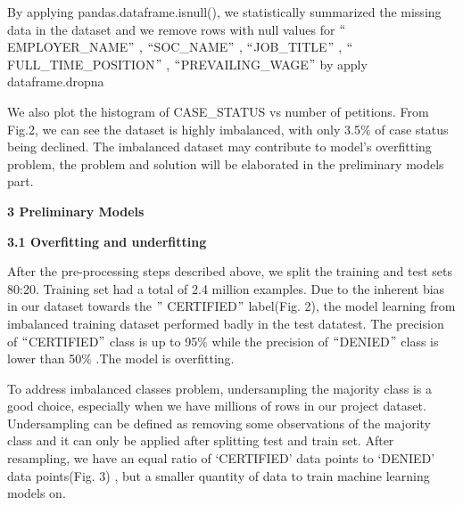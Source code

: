 \documentclass[12pt]{article}
\begin{document}
\begin{justify}
By applying pandas.dataframe.isnull(), we statistically summarized the missing data in the dataset and we remove rows with null values for $``$EMPLOYER\_NAME$"$ , $``$SOC\_NAME$"$ , $``$JOB\_TITLE$"$ , $``$FULL\_TIME\_POSITION$"$ , $``$PREVAILING\_WAGE$"$  by apply dataframe.dropna
\end{justify}\par

\begin{justify}
We also plot the histogram of CASE\_STATUS vs number of petitions. From Fig.2, we can see the dataset is highly imbalanced, with only 3.5$\%$  of case status being declined. The imbalanced dataset may contribute to model’s overfitting problem, the problem and solution will be elaborated in the preliminary models part.
\end{justify}\par

\tab 
\vspace{\baselineskip}\begin{FlushLeft}
{\fontsize{14pt}{16.8pt}\selectfont \textbf{3 Preliminary Models}\par}
\end{FlushLeft}\par

\begin{FlushLeft}
\textbf{3.1 Overfitting and underfitting}
\end{FlushLeft}\par

\begin{justify}
After the pre-processing steps described above, we split the training and test sets 80:20. Training set had a total of 2.4 million examples. Due to the inherent bias in our dataset towards the $"$ CERTIFIED$"$  label(Fig. 2), the model learning from imbalanced training dataset performed badly in the test datatest. The precision of $``$CERTIFIED$"$  class is up to 95$\%$  while the precision of $``$DENIED$"$  class is lower than 50$\%$  .The model is overfitting.
\end{justify}\par

\begin{justify}
To address imbalanced classes problem, undersampling the majority class is a good choice, especially when we have millions of rows in our project dataset. Undersampling can be defined as removing some observations of the majority class and it can only be applied after splitting test and train set. After resampling, we have an equal ratio of ‘CERTIFIED’ data points to ‘DENIED’ data points(Fig. 3) , but a smaller quantity of data to train machine learning models on.
\end{justify}\par
\end{document}
